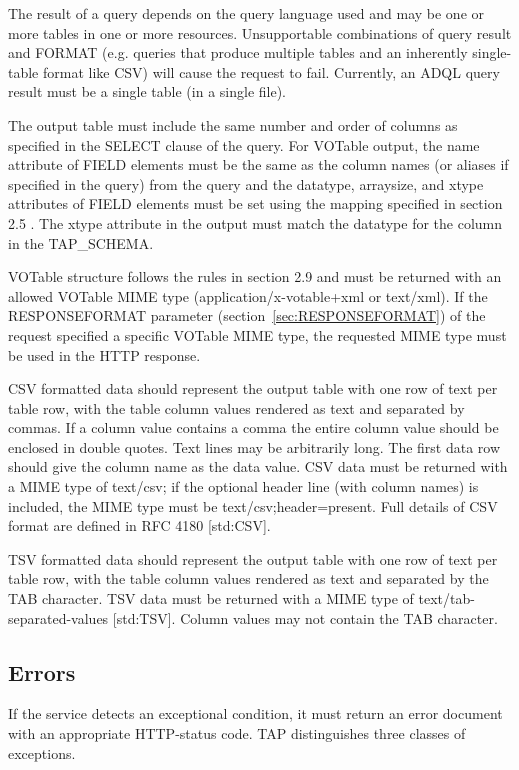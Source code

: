 \documentclass[11pt,letter]{ivoa}
\begin{document}
{The result of a query depends on the query language used and may be one or more 
tables in one or more resources. Unsupportable combinations of query result and 
FORMAT (e.g. queries that produce multiple tables and an inherently 
single-table format like CSV) will cause the request to fail. Currently, an ADQL 
query result must be a single table (in a single file).

The output table must include the same number and order of columns as specified 
in the SELECT clause of the query. For VOTable output, the name attribute of 
FIELD elements must be the same as the column names (or aliases if specified in 
the query) from the query and the datatype, arraysize, and xtype attributes of 
FIELD elements must be set using the mapping specified in section 2.5 . The 
xtype attribute in the output must match the datatype for the column in the 
TAP\_SCHEMA.

VOTable structure follows the rules in section 2.9 and must be returned with an 
allowed VOTable MIME type (application/x-votable+xml or text/xml). If the 
RESPONSEFORMAT parameter (section~\ref{sec:RESPONSEFORMAT}) of the request 
specified a specific VOTable MIME type, the requested MIME type must be used 
in the HTTP response.

CSV formatted data should represent the output table with one row of text per 
table row, with the table column values rendered as text and separated by 
commas. If a column value contains a comma the entire column value should be 
enclosed in double quotes.  Text lines may be arbitrarily long.  The first data 
row should give the column name as the data value.   CSV data must be returned 
with a MIME type of text/csv; if the optional header line (with column names) 
is included, the MIME type must be text/csv;header=present. Full details of CSV 
format are defined in RFC 4180 [std:CSV].

TSV formatted data should represent the output table with one row of text per 
table row, with the table column values rendered as text and separated by the 
TAB character. TSV data must be returned with a MIME type of 
text/tab-separated-values [std:TSV]. Column values may not contain the TAB 
character.

\subsection{Errors}
\label{sec:query-error}

If the service detects an exceptional condition, it must return an error 
document with an appropriate HTTP-status code. TAP distinguishes three classes 
of exceptions.

}
\end{document}
